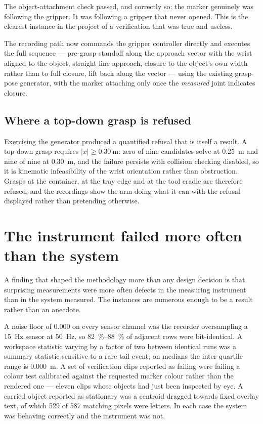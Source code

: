 The object-attachment check passed, and correctly so: the marker genuinely was
following the gripper. It was following a gripper that never opened. This is
the clearest instance in the project of a verification that was true and
useless.

The recording path now commands the gripper controller directly and executes
the full sequence --- pre-grasp standoff along the approach vector with the
wrist aligned to the object, straight-line approach, closure to the object's
own width rather than to full closure, lift back along the vector --- using the
existing grasp-pose generator, with the marker attaching only once the
\emph{measured} joint indicates closure.

\subsection{Where a top-down grasp is refused}

Exercising the generator produced a quantified refusal that is itself a
result. A top-down grasp requires $|x| \ge \SI{0.30}{\metre}$: zero of nine
candidates solve at \SI{0.25}{\metre} and nine of nine at \SI{0.30}{\metre},
and the failure persists with collision checking disabled, so it is kinematic
infeasibility of the wrist orientation rather than obstruction. Grasps at the
container, at the tray edge and at the tool cradle are therefore refused, and
the recordings show the arm doing what it can with the refusal displayed
rather than pretending otherwise.

\section{The instrument failed more often than the system}
\label{sec:instrument}

A finding that shaped the methodology more than any design decision is that
surprising measurements were more often defects in the measuring instrument
than in the system measured. The instances are numerous enough to be a result
rather than an anecdote.

A noise floor of \num{0.000} on every sensor channel was the recorder
oversampling a \SI{15}{\hertz} sensor at \SI{50}{\hertz}, so
\SIrange{82}{88}{\percent} of adjacent rows were bit-identical. A workspace
statistic varying by a factor of two between identical runs was a summary
statistic sensitive to a rare tail event; on medians the inter-quartile range
is \SI{0.000}{\metre}. A set of verification clips reported as failing were
failing a colour test calibrated against the requested marker colour rather
than the rendered one --- eleven clips whose objects had just been inspected by
eye. A carried object reported as stationary was a centroid dragged towards
fixed overlay text, of which \num{529} of \num{587} matching pixels were
letters. In each case the system was behaving correctly and the instrument was
not.

